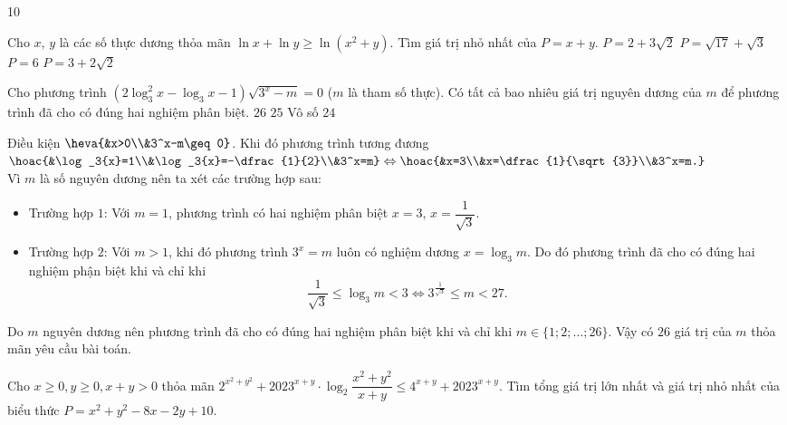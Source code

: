 \begin{indapan}{10}
\begin{ex}
	Cho $x$, $y$ là các số thực dương thỏa mãn $\ln x+\ln y\ge \ln (x^2+y)$. Tìm giá trị nhỏ nhất của $P=x+y$.
	\choice
	{$P=2+3\sqrt{2}$}
	{$P=\sqrt{17}+\sqrt{3}$}
	{$P=6$}
	{\True $P=3+2\sqrt{2}$}
\end{ex}

\begin{ex}
	Cho phương trình $\left(2\log_3^{2}x-\log_3x-1 \right)\sqrt{3^x-m}=0$ ($m$ là tham số thực). Có tất cả bao nhiêu giá trị nguyên dương của $m$ để phương trình đã cho có đúng hai nghiệm phân biệt.
	\choice
	{\True $26$}
	{$25$}
	{Vô số}
	{$24$}
	\loigiai
	{Điều kiện $\heva{&x>0\\&3^x-m\geq 0}$. Khi đó phương trình tương đương $\hoac{&\log_3{x}=1\\&\log_3{x}=-\dfrac{1}{2}\\&3^x=m} \Leftrightarrow \hoac{&x=3\\&x=\dfrac{1}{\sqrt{3}}\\&3^x=m.}$\\
		Vì $m$ là số nguyên dương nên ta xét các trường hợp sau:
		\begin{itemize}
			\item Trường hợp $1$: Với $m=1$, phương trình có hai nghiệm phân biệt $x=3$, $x=\dfrac{1}{\sqrt{3}}$.
			\item Trường hợp $2$: Với $m>1$, khi đó phương trình $3^x=m$ luôn có nghiệm dương $x=\log_3{m}$. Do đó phương trình đã cho có đúng hai nghiệm phận biệt khi và chỉ khi
			$$\dfrac{1}{\sqrt{3}}\leq \log_3{m}<3 \Leftrightarrow 3^{\tfrac{1}{\sqrt{3}}} \leq m <27.$$
		\end{itemize}
		Do $m$ nguyên dương nên phương trình đã cho có đúng hai nghiệm phân biệt khi và chỉ khi $m\in \{1;2;\ldots;26\}$. Vậy có $26$ giá trị của $m$ thỏa mãn yêu cầu bài toán.
	}
\end{ex}
\begin{ex}
	Cho $x\geq 0, y\geq 0, x+y>0$ thỏa mãn $2^{x^2+y^2}+2023^{x+y} \cdot \log _2 \dfrac{x^2+y^2}{x+y} \leq 4^{x+y}+2023^{x+y}$. Tìm tổng giá trị lớn nhất và giá trị nhỏ nhất của biểu thức $P=x^2+y^2-8x-2y+10$.

\end{ex}
\end{indapan}

